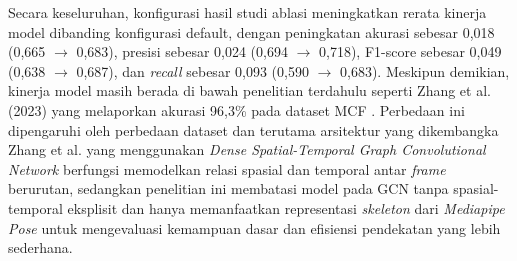 Secara keseluruhan, konfigurasi hasil studi ablasi meningkatkan rerata kinerja model dibanding konfigurasi default, dengan peningkatan akurasi sebesar 0,018 (0,665 \(\rightarrow\) 0,683), presisi sebesar 0,024 (0,694 \(\rightarrow\) 0,718), F1-score sebesar 0,049 (0,638 \(\rightarrow\) 0,687), dan \textit{recall} sebesar 0,093 (0,590 \(\rightarrow\) 0,683). Meskipun demikian, kinerja model masih berada di bawah penelitian terdahulu seperti Zhang et al. (2023) yang melaporkan akurasi 96,3\% pada dataset MCF \cite{Zhang2023}. Perbedaan ini dipengaruhi oleh perbedaan dataset dan terutama arsitektur yang dikembangka Zhang et al. yang menggunakan \textit{Dense Spatial-Temporal Graph Convolutional Network} berfungsi memodelkan relasi spasial dan temporal antar \textit{frame} berurutan, sedangkan penelitian ini membatasi model pada GCN tanpa spasial-temporal eksplisit dan hanya memanfaatkan representasi \textit{skeleton} dari \textit{Mediapipe Pose} untuk mengevaluasi kemampuan dasar dan efisiensi pendekatan yang lebih sederhana. \par